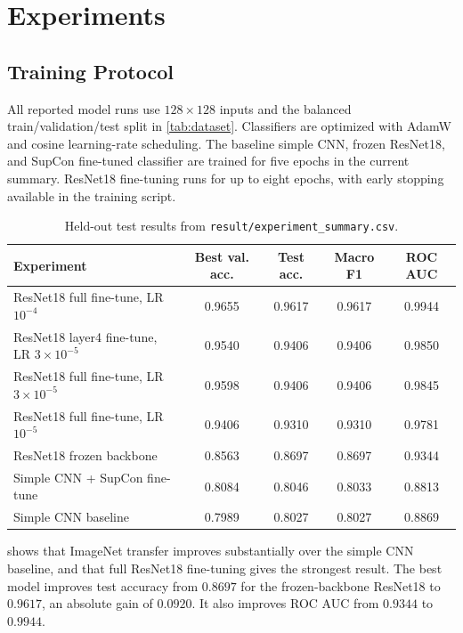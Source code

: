 \section{Experiments}

\subsection{Training Protocol}

All reported model runs use \(128\times128\) inputs and the balanced train/validation/test split in \cref{tab:dataset}. Classifiers are optimized with AdamW and cosine learning-rate scheduling. The baseline simple CNN, frozen ResNet18, and SupCon fine-tuned classifier are trained for five epochs in the current summary. ResNet18 fine-tuning runs for up to eight epochs, with early stopping available in the training script.

\begin{table}[t]
  \centering
  \caption{Held-out test results from \texttt{result/experiment\_summary.csv}.}
  \label{tab:main-results}
  \begin{tabular}{lS[table-format=1.4]S[table-format=1.4]S[table-format=1.4]S[table-format=1.4]}
    \toprule
    Experiment & {Best val. acc.} & {Test acc.} & {Macro F1} & {ROC AUC} \\
    \midrule
    ResNet18 full fine-tune, LR \(10^{-4}\) & 0.9655 & 0.9617 & 0.9617 & 0.9944 \\
    ResNet18 layer4 fine-tune, LR \(3\times10^{-5}\) & 0.9540 & 0.9406 & 0.9406 & 0.9850 \\
    ResNet18 full fine-tune, LR \(3\times10^{-5}\) & 0.9598 & 0.9406 & 0.9406 & 0.9845 \\
    ResNet18 full fine-tune, LR \(10^{-5}\) & 0.9406 & 0.9310 & 0.9310 & 0.9781 \\
    ResNet18 frozen backbone & 0.8563 & 0.8697 & 0.8697 & 0.9344 \\
    Simple CNN + SupCon fine-tune & 0.8084 & 0.8046 & 0.8033 & 0.8813 \\
    Simple CNN baseline & 0.7989 & 0.8027 & 0.8027 & 0.8869 \\
    \bottomrule
  \end{tabular}
\end{table}

 shows that ImageNet transfer improves substantially over the simple CNN baseline, and that full ResNet18 fine-tuning gives the strongest result. The best model improves test accuracy from \(0.8697\) for the frozen-backbone ResNet18 to \(0.9617\), an absolute gain of \(0.0920\). It also improves ROC AUC from \(0.9344\) to \(0.9944\).

